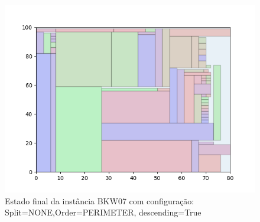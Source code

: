\begin{figure}[H]
    \centering
    \caption[]{Estado final da instância BKW07 com configuração: Split=NONE,Order=PERIMETER, descending=True}
    \label{fig:bkw07-none-perimeter-true}
    \includegraphics[scale=0.5]{output/figures/bkw/bkw07/none/perimeter/true/00}
\end{figure}